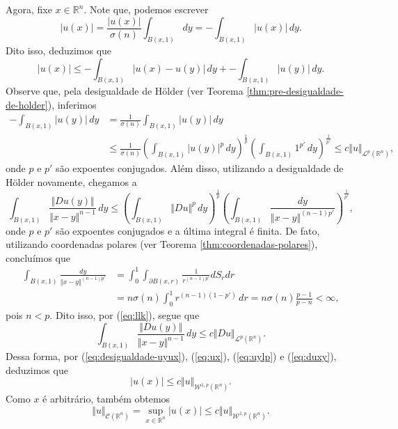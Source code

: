 \documentclass[a4paper, 11pt]{book}
\theoremstyle{definition}
\newcommand{\bR}{\mathbb{R}}
\newcommand{\cC}{\mathcal{C}}
\newcommand{\cL}{\mathcal{L}}
\newcommand{\cW}{\mathcal{W}}
\newcommand{\sint}{-\!\!\!\!\!\!\int}
\begin{document}
\begin{prf}
    Agora, fixe $x \in \bR^n$. Note que, podemos escrever
    \[
        |u(x)| = \frac{|u(x)|}{\sigma(n)}\int_{B(x,1)} dy = \sint_{B(x,1)} |u(x)| \,dy.
    \]
    Dito isso, deduzimos que
    \begin{equation} \label{eq:ux}
        |u(x)| \leqslant \sint_{B(x,1)} |u(x) - u(y)| \,dy + \sint_{B(x,1)} |u(y)|\,dy.
    \end{equation}
    Observe que, pela desigualdade de Hölder (ver Teorema \ref{thm:pre-desigualdade-de-holder}), inferimos
    \begin{equation} \label{eq:uylp}
        \begin{aligned}
            \sint_{B(x,1)} |u(y)| \,dy &= \frac{1}{\sigma(n)} \int_{B(x,1)} |u(y)| \,dy\\ 
            &\leqslant \frac{1}{\sigma(n)} \left( \int_{B(x,1)} |u(y)|^p\,dy \right)^{\frac{1}{p}} \left( \int_{B(x,1)} 1^{p'} \,dy \right)^{\frac{1}{p'}} \leqslant c \Vert u \Vert_{\cL^p(\bR^n)},
        \end{aligned}
    \end{equation}
    onde $p$ e $p'$ são expoentes conjugados.
    Além disso, utilizando a desigualdade de Hölder novamente, chegamos a
    \begin{equation} \label{eq:llk}
        \int_{B(x,1)} \frac{\Vert Du(y) \Vert}{\Vert x - y \Vert^{n-1}} \,dy \leqslant \left( \int_{B(x,1)} \Vert Du \Vert^p \,dy \right)^{\frac{1}{p}} \left( \int_{B(x,1)} \frac{dy}{\Vert x - y \Vert^{(n-1)p'}} \right)^{\frac{1}{p'}},
    \end{equation}
    onde $p$ e $p'$ são expoentes conjugados e a última integral é finita.
    De fato, utilizando coordenadas polares (ver Teorema \ref{thm:coordenadas-polares}), concluímos que
    \[
        \begin{aligned}
            \int_{B(x,1)} \frac{dy}{\Vert x - y \Vert^{(n-1)p'}} &= \int_0^1 \int_{\partial B(x,r)} \frac{1}{r^{(n-1)p'}} dS_rdr\\
            &= n\sigma(n)\int_0^1 r^{(n-1)(1-p')} \,dr = n \sigma(n)  \frac{p-1}{p-n} < \infty,
        \end{aligned}
    \]
    pois $n < p$.
    Dito isso, por (\ref{eq:llk}), segue que
    \begin{equation} \label{eq:duxy}
        \int_{B(x,1)} \frac{\Vert Du(y) \Vert}{\Vert x - y \Vert^{n-1}} \,dy \leqslant c\Vert Du \Vert_{\cL^p(\bR^n)}.
    \end{equation}
    Dessa forma, por (\ref{eq:desigualdade-uyux}), (\ref{eq:ux}), (\ref{eq:uylp}) e (\ref{eq:duxy}), deduzimos que
    \[
        |u(x)| \leqslant c \Vert u \Vert_{\cW^{1,p}(\bR^n)}.
    \]
    Como $x$ é arbitrário, também obtemos
    \begin{equation} \label{eq:normac}
        \Vert u \Vert_{\cC(\bR^n)} = \sup_{x \in \bR^n} |u(x)| \leqslant c \Vert u \Vert_{\cW^{1,p}(\bR^n)}.
    \end{equation}


\end{prf}
\end{document}
